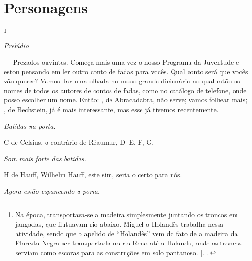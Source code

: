 \section{Personagens}

\begin{myparindent}{0pt}



\footnote{Na época, transportava-se a madeira
  simplesmente juntando os troncos em jangadas, que flutuavam rio
  abaixo. Miguel o Holandês trabalha nessa atividade, sendo que o
  apelido de ``Holandês'' vem do fato de a madeira da Floresta Negra ser
  transportada no rio Reno até a Holanda, onde os troncos serviam como
  escoras para as construções em solo pantanoso. [. .]}










\bigskip

\emph{Prelúdio}

\begin{Parskip}
 --- Prezados ouvintes. Começa mais uma vez o nosso Programa da
Juventude e estou pensando em ler outro conto de fadas para vocês. Qual
conto será que vocês vão querer? Vamos dar uma olhada no nosso grande
dicionário no qual estão os nomes de todos os autores de contos de
fadas, como no catálogo de telefone, onde posso escolher um nome. Então:
, de Abracadabra, não serve; vamos folhear mais; , de Bechstein, já é
mais interessante, mas esse já tivemos recentemente.

\emph{Batidas na porta.}

C de Celsius, o contrário de Réaumur, D, E, F, G.

\emph{Som mais forte das batidas.}

H de Hauff, Wilhelm Hauff, este sim, seria o certo para nós.

\emph{Agora estão espancando a porta}.


\end{Parskip}
\end{myparindent}
